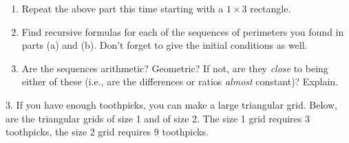 \documentclass[10pt,]{book}
\theoremstyle{plain}
\theoremstyle{definition}
\theoremstyle{definition}
\theoremstyle{definition}
\numberwithin{equation}{chapter}
\newlength{\panelmax}
\begin{document}
\begin{exerciselist}
\begin{enumerate}[label=(\alph*)]
\item\hypertarget{li-1018}{}
                Repeat the above part this time starting with a \(1 \times 3\) rectangle.


\item\hypertarget{li-1019}{}
                Find recursive formulas for each of the sequences of perimeters you found in parts (a) and (b). Don't forget to give the initial conditions as well.


\item\hypertarget{li-1020}{}
                Are the sequences arithmetic? Geometric? If not, are they \emph{close} to being either of these (i.e., are the differences or ratios \emph{almost} constant)? Explain.


\end{enumerate}
\par\smallskip
\item[3.]\hypertarget{exercise-207}{}
            If you have enough toothpicks, you can make a large triangular grid. Below, are the triangular grids of size 1 and of size 2. The size 1 grid requires 3 toothpicks, the size 2 grid requires 9 toothpicks.
{%
\setlength{\panelmax}{0pt}
\newsavebox{\panelboxAUimage}
\newlength{\phAUimage}\setlength{\phAUimage}{\ht\panelboxAUimage+\dp\panelboxAUimage}
\settototalheight{\phAUimage}{\usebox{\panelboxAUimage}}
\setlength{\panelmax}{\maxof{\panelmax}{\phAUimage}}
\newsavebox{\panelboxAVimage}
}
\end{exerciselist}
\end{document}
